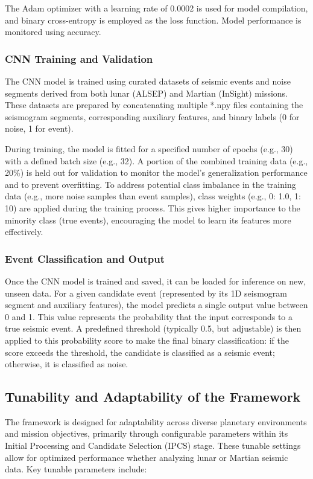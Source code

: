 \documentclass[conference]{IEEEtran}
\begin{document}
            The Adam optimizer \cite{Kingma2014} with a learning rate of 0.0002 is used for model compilation, and binary cross-entropy is employed as the loss function. Model performance is monitored using accuracy.
        
        \subsubsection{CNN Training and Validation}
            The CNN model is trained using curated datasets of seismic events and noise segments derived from both lunar
            (ALSEP) and Martian (InSight) missions. These datasets are prepared by concatenating multiple *.npy files
            containing the seismogram segments, corresponding auxiliary features, and binary labels (0 for noise, 1 for
            event).
        
        During training, the model is fitted for a specified number of epochs (e.g., 30) with a defined batch size
            (e.g., 32). A portion of the combined training data (e.g., 20\%) is held out for validation to monitor the
            model's generalization performance and to prevent overfitting. To address potential class imbalance in the
            training data (e.g., more noise samples than event samples), class weights (e.g., {0: 1.0, 1: 10}) are applied
            during the training process. This gives higher importance to the minority class (true events), encouraging the
            model to learn its features more effectively.
        
        \subsubsection{Event Classification and Output}
            Once the CNN model is trained and saved, it can be loaded for inference on new, unseen data. For a given
            candidate event (represented by its 1D seismogram segment and auxiliary features), the model predicts a
            single output value between 0 and 1. This value represents the probability that the input corresponds to a
            true seismic event. A predefined threshold (typically 0.5, but adjustable) is then applied to this
            probability score to make the final binary classification: if the score exceeds the threshold, the candidate
            is classified as a seismic event; otherwise, it is classified as noise.
        
        \subsection{Tunability and Adaptability of the Framework}
            The framework is designed for adaptability across diverse planetary environments and mission objectives,
            primarily through configurable parameters within its Initial Processing and Candidate Selection (IPCS)
            stage. These tunable settings allow for optimized performance whether analyzing lunar or Martian seismic
            data.
            Key tunable parameters include:
\end{document}
